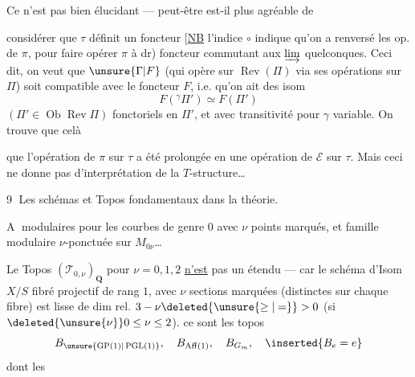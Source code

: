 Ce n'est pas bien élucidant --- peut-être est-il plus agréable de

considérer que  $\tau$ définit  un foncteur
[\uline{NB} l'indice $\circ$ indique qu'on a renversé les op. de $\pi$, pour faire opérer $\pi$ à dr)
foncteur commutant aux $\varinjlim$ quelconques. Ceci dit, on veut que $\unsure{\Gamma|F}$ (qui opère sur $\operatorname{Rev}(\Pi)$ via ses opérations sur $\Pi$) soit compatible avec le foncteur $F$, i.e. qu'on ait des isom
\[
F({}^{\gamma}\Pi')\simeq F(\Pi')
\]
$(\Pi'\in\operatorname{Ob}\operatorname{Rev}\Pi)$ fonctoriels en $\Pi'$, et avec transitivité pour $\gamma$ variable. On trouve que celà 

que l'opération de $\pi$ sur $\tau$ a été prolongée en une opération de $\mathcal E$ sur $\tau$. Mais ceci ne donne pas d'interprétation  de la $T$-structure\ldots
{}

\textcircled{9} Les schémas et Topos fondamentaux dans la théorie.

\textcircled{A}   modulaires  pour les courbes de genre $0$ avec $\nu$ points marqués, et famille  modulaire  $\nu$-ponctuée sur $M_{0\nu}$\ldots

Le Topos $(\mathcal T_{0,\nu})_{\mathbf Q}$ pour $\nu=0,1,2$ \uline{n'est} pas un étendu --- car le schéma d'Isom  $X/S$ fibré projectif de rang $1$, avec $\nu$ sections marquées (distinctes sur chaque fibre) est lisse de dim rel. $3-\nu\deleted{\unsure{\geq|=}}>0$ (si $\deleted{\unsure{\nu}}0\leq\nu\leq2$).
  ce sont les topos
\[
B_{\unsure{\operatorname{GP}(1)|\operatorname{PGL}(1)}},\quad B_{\operatorname{Aff}(1)},\quad B_{G_m},\quad\inserted{B_e=e}
\]
dont les

